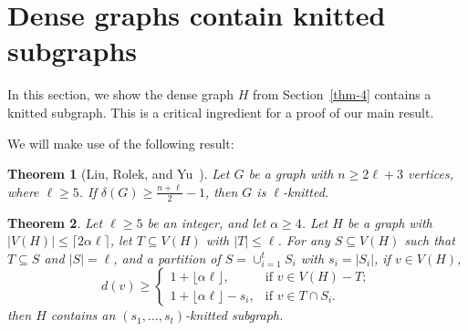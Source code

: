 \documentclass[11pt]{amsart}
\newtheorem{theorem}{Theorem}
\begin{document}
\section{Dense graphs contain  knitted subgraphs}\label{thm-2}

In this section, we show the dense graph $H$ from Section~\ref{thm-4} contains a knitted subgraph. This is a critical ingredient for a proof of our main result. 


We will make use of the following result:

\begin{theorem}[Liu, Rolek, and Yu~\cite{LRY19}]\label{LRY}
Let $G$ be a graph with $n \ge 2\ell + 3$ vertices, where $\ell \ge 5$. If $\delta(G) \ge \frac{n+\ell}{2} - 1$, then $G$ is $\ell$-knitted.
\end{theorem}


\begin{theorem}\label{subgraph}
Let $\ell \ge 5$ be an integer, and let $\alpha \ge 4$. Let $H$ be a graph with $|V(H)| \le  \lceil 2\alpha \ell \rceil$, let $T \subseteq V(H)$ with $|T| \le \ell$. For any $S \subseteq V(H)$ such that $T \subseteq S$ and $|S| = \ell$, and a partition of $S=\cup_{i=1}^t S_i$ with $s_i=|S_i|$, if $v \in V(H)$, 
\[
d(v)\ge 
\begin{cases}
1+\lfloor\alpha\ell\rfloor,  &  \mbox{if $v \in V(H) - T$};\\
    1+\lfloor\alpha \ell\rfloor-s_i, & \mbox{if $v \in T\cap S_i$}.
\end{cases}
\]
then $H$ contains an $(s_1, \ldots, s_t)$-knitted subgraph.
\end{theorem}
\end{document}
